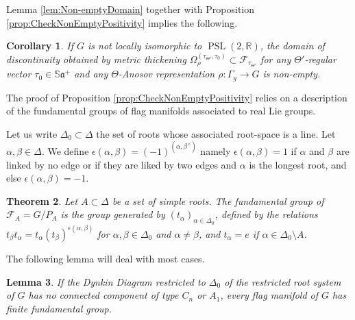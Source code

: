 \documentclass[reqno,10pt]{amsart}
\theoremstyle{plain}
\newtheorem{thm}{Theorem}[section]
\newtheorem{lem}[thm]{Lemma}
\newtheorem{cor}[thm]{Corollary}
\theoremstyle{definition}
\theoremstyle{remark}
\newcommand{\type}{\tau}
\newcommand{\typeS}{{\tau_0}}
\newcommand{\R}{\mathbb{R}}
\newcommand{\Sph}{\mathbb{S}}
\DeclareMathOperator{\PSL}{PSL}
\newcommand{\ie}{namely }
\begin{document}
Lemma \ref{lem:Non-emptyDomain} together with Proposition \ref{prop:CheckNonEmptyPositivity} implies the following.

\begin{cor}
\label{cor:CheckNonEmptyPositivity}
If $G$ is not locally isomorphic to $\PSL(2,\R)$, the domain of discontinuity obtained by metric thickening $\Omega_\rho^{(\type_{\Theta'},\typeS)}\subset \mathcal{F}_{\type_{\Theta'}}$ for any $\Theta'$-regular vector $\typeS\in \Sph\mathfrak{a}^+$ and any $\Theta$-Anosov representation $\rho:\Gamma_g\to G$ is non-empty.
\end{cor}

\medskip

The proof of Proposition \ref{prop:CheckNonEmptyPositivity} relies on a description of the fundamental groups of flag manifolds associated to real Lie groups.

\medskip

Let us write $\Delta_0\subset \Delta$ the set of roots whose associated root-space is a line. Let $\alpha,\beta\in \Delta$. We define $\epsilon(\alpha,\beta)=(-1)^{(\alpha, \beta^\vee)}$ \ie $\epsilon(\alpha, \beta)=1$ if $\alpha$ and $\beta$ are linked by no edge or if they are liked by two edges and $\alpha$ is the longest root, and else $\epsilon(\alpha, \beta)=-1$.

\begin{thm}{\cite[Theorem 1.1]{ThesisTopologyFlag}}
Let $A\subset \Delta$  be a set of simple roots.  The fundamental group of $\mathcal{F}_A=G/P_A$ is the group generated by $(t_\alpha)_{\alpha\in \Delta_0}$, defined by the relations $t_\beta t_\alpha=t_\alpha \left(t_\beta\right)^{\epsilon(\alpha, \beta)}$ for $\alpha,\beta\in \Delta_0$ and $\alpha\neq \beta$, and $t_\alpha=e$ if $\alpha\in \Delta_0\setminus A$. 
\end{thm}

The following lemma will deal with most cases.

\begin{lem}
\label{lem:DynkinFlag}
If the Dynkin Diagram restricted to $\Delta_0$ of the restricted root system of $G$ has no connected component of type $C_n$ or $A_1$, every flag manifold of $G$ has finite fundamental group.
\end{lem}
\end{document}
